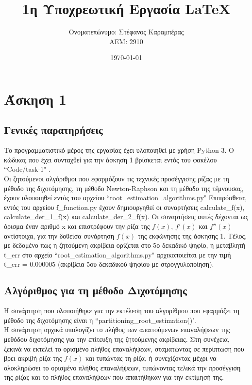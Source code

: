 \documentclass[a4paper,11pt]{article}
\title{1η Υποχρεωτική Εργασία \lt LaTeX} %
\author{Ονοματεπώνυμο: Στέφανος Καραμπέρας  \\  ΑΕΜ: 2910}       %
\date{\today}                                      %
\newcommand{\lt}{\latintext}
\begin{document}

\maketitle

\section*{Άσκηση 1}
\subsection*{Γενικές παρατηρήσεις}
Το προγραμματιστικό μέρος της εργασίας έχει υλοποιηθεί με χρήση Python 3.
Ο κώδικας που έχει συνταχθεί για την άσκηση 1 βρίσκεται εντός του φακέλου {\lt ``Code/task-1" }.\\
Οι ζητούμενοι αλγόριθμοι που εφαρμόζουν τις τεχνικές προσέγγισης ρίζας με τη μέθοδο της διχοτόμησης, τη μέθοδο {\lt Newton-Raphson} και τη μέθοδο της τέμνουσας, έχουν υλοποιηθεί
εντός του αρχείου {\lt ``root\_estimation\_algorithms.py"}
Επιπρόσθετα, εντός του αρχείου {\lt f\_function.py} έχουν δημιουργηθεί οι συναρτήσεις {\lt calculate\_f(x)}, {\lt calculate\_der\_1\_f(x)} και {\lt calculate\_der\_2\_f(x)}. Οι συναρτήσεις αυτές δέχονται ως όρισμα έναν
αριθμό x και επιστρέφουν την ρίζα της {\lt $f(x)$}, {\lt $f'(x)$} και {\lt $f''(x)$} αντίστοιχα,  για την δοθείσα συνάρτηση {\lt $f(x)$} της εκφώνησης της άσκησης 1.
Τέλος, με δεδομένο πως η ζητούμενη ακρίβεια ορίζεται στο 5ο δεκαδικό ψηφίο, η μεταβλητή {\lt t\_err}  στο αρχείο {\lt ``root\_estimation\_algorithms.py"} αρχικοποιείται με την τιμή {\lt t\_err} = 0.000005 (ακρίβεια 5ου 			δεκαδικού ψηφίου με στρογγυλοποίηση).
\subsection*{Αλγόριθμος για τη μέθοδο Διχοτόμησης}
Η συνάρτηση που υλοποιήθηκε για την εκτέλεση του αλγορίθμου που εφαρμόζει τη μέθοδο της διχοτόμησης είναι η {\lt ``partitioning\_root\_estimation()"}. \\
Η συνάρτηση αρχικά υπολογίζει το πλήθος των απαιτούμενων επαναλήψεων της μεθόδου διχοτόμησης για την επίτευξη της ζητούμενης ακρίβειας.  Στη συνέχεια, ξεκινά να εκτελεί το ορισμένο πλήθος επαναλήψεων, 				σταματώντας σε περίπτωση που βρει ακριβή ρίζα της {\lt$f(x)$} και τυπώντας τη ρίζα, ή συνεχίζοντας μέχρι να ολοκληρώσει το ορισμένο πλήθος επαναλήψεων, τυπώνοντας τελικά την προσέγγιση της ρίζας και το 				πλήθος επαναλήψεων που απαιτήθηκαν για την εκτίμησή της.\\
\end{document}

